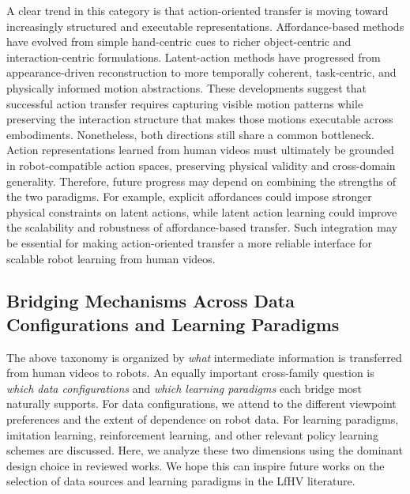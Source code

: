 \documentclass[Afour,sageh,times]{sagej}
\begin{document}
A clear trend in this category is that action-oriented transfer is moving toward increasingly structured and executable representations. Affordance-based methods have evolved from simple hand-centric cues to richer object-centric and interaction-centric formulations. Latent-action methods have progressed from appearance-driven reconstruction to more temporally coherent, task-centric, and physically informed motion abstractions. These developments suggest that successful action transfer requires capturing visible motion patterns while preserving the interaction structure that makes those motions executable across embodiments. Nonetheless, both directions still share a common bottleneck. Action representations learned from human videos must ultimately be grounded in robot-compatible action spaces, preserving physical validity and cross-domain generality. Therefore, future progress may depend on combining the strengths of the two paradigms. For example, explicit affordances could impose stronger physical constraints on latent actions, while latent action learning could improve the scalability and robustness of affordance-based transfer. Such integration may be essential for making action-oriented transfer a more reliable interface for scalable robot learning from human videos.

\subsection{Bridging Mechanisms Across Data Configurations and Learning Paradigms}

The above taxonomy is organized by \textit{what} intermediate information is transferred from human videos to robots. An equally important cross-family question is \textit{which data configurations} and \textit{which learning paradigms} each bridge most naturally supports. For data configurations, we attend to the different viewpoint preferences and the extent of dependence on robot data. For learning paradigms, imitation learning, reinforcement learning, and other relevant policy learning schemes are discussed. Here, we analyze these two dimensions using the dominant design choice in reviewed works. We hope this can inspire future works on the selection of data sources and learning paradigms in the LfHV literature.
\end{document}
